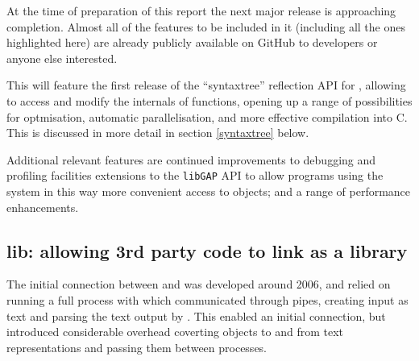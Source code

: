 \documentclass{deliverablereport}
\begin{document}
At the time of preparation of this report the next major release  is approaching completion. Almost all of the features to be
included in it (including all the ones highlighted here) are already
publicly  available on GitHub to developers or anyone else interested.

This will feature the first release of the ``syntaxtree'' reflection
API for \GAP, allowing \GAP to access and modify the internals of \GAP
functions, opening up a range of possibilities for optmisation, automatic
parallelisation, and more effective compilation into C. This is
discussed in more detail in section \ref{syntaxtree} below. 

Additional relevant features are continued improvements to debugging and
profiling facilities  extensions to the
\texttt{libGAP} API to allow programs using the system in this way
more convenient access to \GAP objects; and a range of performance
enhancements.


%
%
%



\subsection{lib\GAP: allowing 3rd party code to link \GAP as a library}\label{libgap}

The initial connection between \Sage and \GAP was developed around
2006, and relied on running a full \GAP process with which \Sage
communicated through pipes, creating \GAP input as text and parsing
the text output by \GAP. This enabled an initial connection, but
introduced considerable overhead coverting objects to and from text
representations and passing them between processes.
\end{document}
